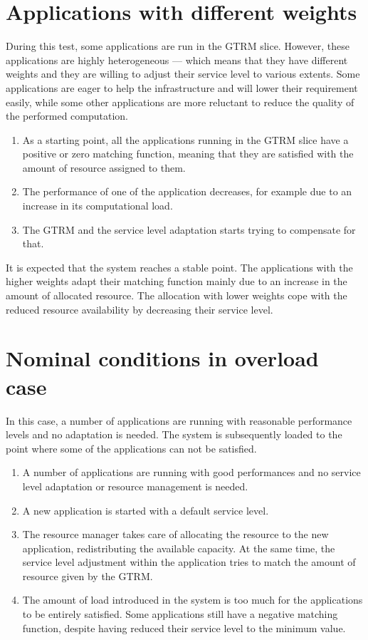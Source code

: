 \documentclass[nobiblatex]{LTHthesis}
\begin{document}
\section{Applications with different weights}

During this test, some applications are run in the GTRM slice. However, these
applications are highly heterogeneous --- which means that they have different
weights and they are willing to adjust their service level to various extents.
Some applications are eager to help the infrastructure and will lower their
requirement easily, while some other applications are more reluctant to
reduce the quality of the performed computation.

\begin{enumerate}
\item As a starting point, all the applications running in the GTRM slice
  have a positive or zero matching function, meaning that they are satisfied
  with the amount of resource assigned to them.
\item The performance of one of the application decreases, for example due to
  an increase in its computational load.
\item The GTRM and the service level adaptation starts trying to compensate
  for that.
\end{enumerate}

It is expected that the system reaches a stable point. The applications with
the higher weights adapt their matching function mainly due to an increase
in the amount of allocated resource. The allocation with lower weights cope
with the reduced resource availability by decreasing their service level.

\section{Nominal conditions in overload case}

In this case, a number of applications are running with reasonable
performance levels and no adaptation is needed. The system is subsequently
loaded to the point where some of the applications can not be satisfied.

\begin{enumerate}
\item A number of applications are running with good performances and 
  no service level adaptation or resource management is needed.
\item A new application is started with a default service level.
\item The resource manager takes care of allocating the resource to the
  new application, redistributing the available capacity. At the same
  time, the service level adjustment within the application tries to match
  the amount of resource given by the GTRM.
\item The amount of load introduced in the system is too much for the
  applications to be entirely satisfied. Some applications still have a 
  negative matching function, despite having reduced their service
  level to the minimum value.
\end{enumerate}
\end{document}
